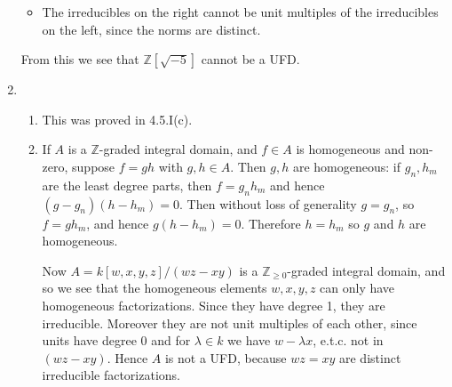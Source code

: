 \documentclass{report}
\newcommand{\Z}{\mathbb{Z}}
\begin{document}
\begin{enumerate}[label=\textbf{5.4.\Alph*.}]
\begin{itemize}
		      \item The irreducibles on the right cannot be unit multiples of the
		            irreducibles on the left, since the norms are distinct.
	      \end{itemize}
	      From this we see that $\Z[\sqrt{-5}]$ cannot be a UFD.

	\item
	      \begin{enumerate}[label=(\alph*)]
		      \item This was proved in 4.5.I(c).

		      \item If $A$ is a $\Z$-graded integral domain, and $f\in A$ is
		            homogeneous and non-zero, suppose $f=gh$ with $g,h\in A$. Then
		            $g,h$ are homogeneous: if $g_n,h_m$ are the least degree parts,
		            then $f=g_nh_m$ and hence $(g-g_n)(h-h_m)=0$. Then without loss
		            of generality $g=g_n$, so $f=gh_m$, and hence $g(h-h_m)=0$.
		            Therefore $h=h_m$ so $g$ and $h$ are homogeneous.

		            Now $A=k[w,x,y,z]/(wz-xy)$ is a $\Z_{\ge0}$-graded integral
		            domain, and so we see that the homogeneous elements $w,x,y,z$
		            can only have homogeneous factorizations. Since they have degree
		            1, they are irreducible. Moreover they are not unit multiples of
		            each other, since units have degree 0 and for $\lambda\in k$ we
		            have $w-\lambda x$, e.t.c. not in $(wz-xy)$. Hence $A$ is not
		            a UFD, because $wz=xy$ are distinct irreducible factorizations.
	      \end{enumerate}


\end{enumerate}
\end{document}
